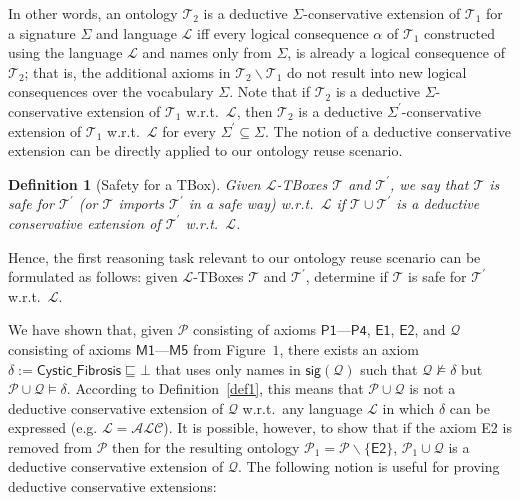 \documentclass[12pt,a4paper]{article}
\newtheorem{definition}{Definition}
\newcommand{\sig}{\textsf{sig}\xspace}
\newenvironment{problems}[2][{\color{purple}Question}]{\begin{trivlist}
\item[\hskip \labelsep {\bfseries #1}\hskip \labelsep {\bfseries #2.}]}{\end{trivlist}}
\begin{document}
\begin{problems}{{\color{purple}6 (with 1 bonus mark)}}
In other words, an ontology $\mathcal{T}_{2}$ is a deductive $\Sigma$-conservative extension of $\mathcal{T}_{1}$ for a signature $\Sigma$ and language $\mathcal{L}$ iff every logical consequence $\alpha$ of $\mathcal{T}_{1}$ constructed using the language $\mathcal{L}$ and names only from $\Sigma$, is already a logical consequence of $\mathcal{T}_{2}$; that is, the additional axioms in $\mathcal{T}_{2}\backslash\mathcal{T}_{1}$ do not result into new logical consequences over the vocabulary $\Sigma$. Note that if $\mathcal{T}_{2}$ is a deductive $\Sigma$-conservative extension of $\mathcal{T}_{1}$ w.r.t.\ $\mathcal{L}$, then $\mathcal{T}_{2}$ is a deductive $\Sigma^{\prime}$-conservative extension of $\mathcal{T}_{1}$ w.r.t.\ $\mathcal{L}$ for every $\Sigma^{\prime}\subseteq\Sigma$. The notion of a deductive conservative extension can be directly applied to our ontology reuse scenario.

\begin{definition}[Safety for a TBox]
Given $\mathcal{L}$-TBoxes $\mathcal{T}$ and $\mathcal{T}^{\prime}$, we say that $\mathcal{T}$ is \emph{safe} for $\mathcal{T}^{\prime}$ (or $\mathcal{T}$ imports $\mathcal{T}^{\prime}$ in a safe way) w.r.t.\ $\mathcal{L}$ if $\mathcal{T}\cup\mathcal{T}^{\prime}$ is a deductive conservative extension of $\mathcal{T}^{\prime}$ w.r.t.\ $\mathcal{L}$.
\label{def2}
\end{definition}
Hence, the first reasoning task relevant to our ontology reuse scenario can be formulated as follows: given $\mathcal{L}$-TBoxes $\mathcal{T}$ and $\mathcal{T}^{\prime}$, determine if $\mathcal{T}$ is safe for $\mathcal{T}^{\prime}$ w.r.t.\ $\mathcal{L}$.

We have shown that, given $\mathcal{P}$ consisting of axioms $\textsf{P1---P4}$, $\textsf{E1}$, $\textsf{E2}$, and $\mathcal{Q}$ consisting of axioms $\textsf{M1---M5}$ from Figure~$1$, there exists an axiom $\delta:= \textsf{Cystic\_Fibrosis}\sqsubseteq\bot$ that uses only names in $\sig(\mathcal{Q})$ such that $\mathcal{Q}\not\models\delta$ but $\mathcal{P}\cup\mathcal{Q}\models\delta$. According to Definition~\ref{def1}, this means that $\mathcal{P}\cup\mathcal{Q}$ is not a deductive conservative extension of $\mathcal{Q}$ w.r.t.\ any language $\mathcal{L}$ in which $\delta$ can be expressed (e.g. $\mathcal{L}=\mathcal{ALC}$). It is possible, however, to show that if the axiom \textsf{E2} is removed from $\mathcal{P}$ then for the resulting ontology $\mathcal{P}_{1}=\mathcal{P}\backslash\{\textsf{E2}\}$, $\mathcal{P}_{1}\cup\mathcal{Q}$ is a deductive conservative extension of $\mathcal{Q}$. The following notion is useful for proving deductive conservative extensions:


\end{problems}
\end{document}
